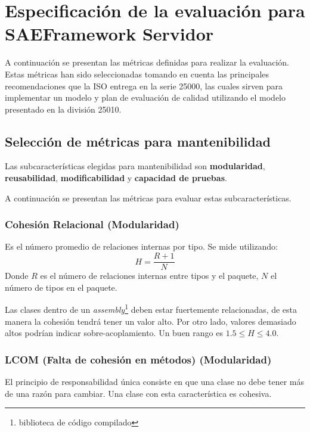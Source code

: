 \section{Especificación de la evaluación para SAEFramework Servidor}

A continuación se presentan las métricas definidas para realizar la evaluación. Estas métricas 
han sido seleccionadas tomando en cuenta las principales recomendaciones que la ISO entrega en 
la serie 25000, las cuales sirven para implementar un modelo y plan de evaluación de calidad 
utilizando el modelo presentado en la división 25010.


\subsection{Selección de métricas para mantenibilidad}
Las subcaracterísticas elegidas para mantenibilidad son \textbf{modularidad}, \textbf{reusabilidad}, 
\textbf{modificabilidad} y \textbf{capacidad de pruebas}.

A continuación se presentan las métricas para evaluar estas subcaracterísticas.

\subsubsection{Cohesión Relacional (Modularidad)}
Es el número promedio de relaciones internas por tipo. Se mide utilizando:
\begin{equation*}
H=\frac{R+1}{N}
\end{equation*}
Donde $R$ es el número de relaciones internas entre tipos y el paquete, $N$ el número de tipos en el paquete.

Las clases dentro de un \textit{assembly}\footnote{biblioteca de código compilado} deben estar fuertemente 
relacionadas, de esta manera la cohesión tendrá tener un valor alto. Por otro lado, valores demasiado altos 
podrían indicar sobre-acoplamiento. Un buen rango es $1.5\leq H\leq 4.0$.


\subsubsection{LCOM (Falta de cohesión en métodos) (Modularidad)}
El principio de responsabilidad única consiste en que una clase no debe tener más de una razón para cambiar. 
Una clase con esta característica es cohesiva.

